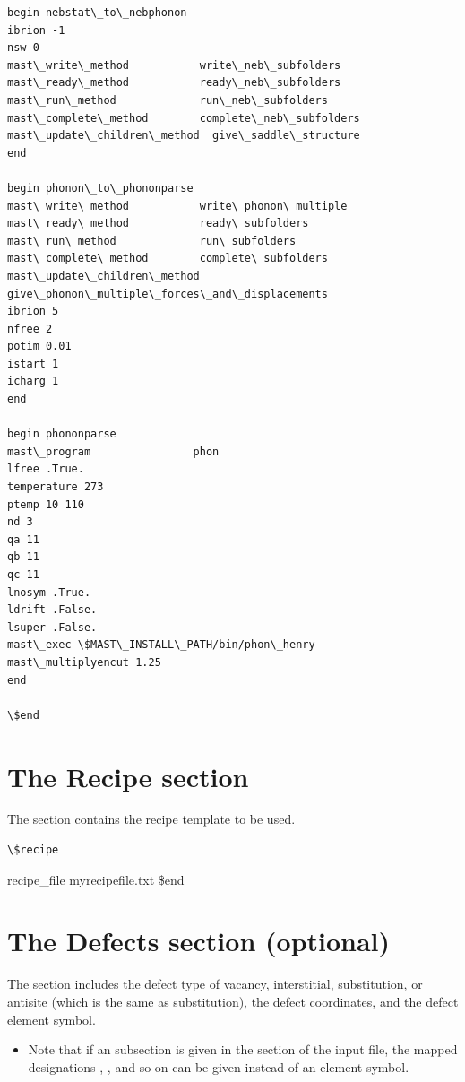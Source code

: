 \documentclass[letterpaper,10pt,english]{sphinxmanual}
\begin{document}
\begin{Verbatim}[commandchars=\\\{\}]
begin nebstat\_to\_nebphonon
ibrion -1
nsw 0
mast\_write\_method           write\_neb\_subfolders
mast\_ready\_method           ready\_neb\_subfolders
mast\_run\_method             run\_neb\_subfolders
mast\_complete\_method        complete\_neb\_subfolders
mast\_update\_children\_method  give\_saddle\_structure
end

begin phonon\_to\_phononparse
mast\_write\_method           write\_phonon\_multiple
mast\_ready\_method           ready\_subfolders
mast\_run\_method             run\_subfolders
mast\_complete\_method        complete\_subfolders
mast\_update\_children\_method  give\_phonon\_multiple\_forces\_and\_displacements
ibrion 5
nfree 2
potim 0.01
istart 1
icharg 1
end

begin phononparse
mast\_program                phon
lfree .True.
temperature 273
ptemp 10 110
nd 3
qa 11
qb 11
qc 11
lnosym .True.
ldrift .False.
lsuper .False.
mast\_exec \$MAST\_INSTALL\_PATH/bin/phon\_henry
mast\_multiplyencut 1.25
end

\$end
\end{Verbatim}


\section{The Recipe section}
\label{3_0_inputfile:the-recipe-section}
The  section contains the recipe template to be used.

\begin{Verbatim}[commandchars=\\\{\}]
\$recipe
\end{Verbatim}

recipe\_file myrecipefile.txt
\$end


\section{The Defects section (optional)}
\label{3_0_inputfile:the-defects-section-optional}
The  section includes the defect type of vacancy, interstitial, substitution, or antisite (which is the same as substitution), the defect coordinates, and the defect element symbol.
\begin{itemize}
\item {} 
Note that if an  subsection is given in the  section of the input file, the mapped designations , , and so on can be given instead of an element symbol.

\end{itemize}
\end{document}
